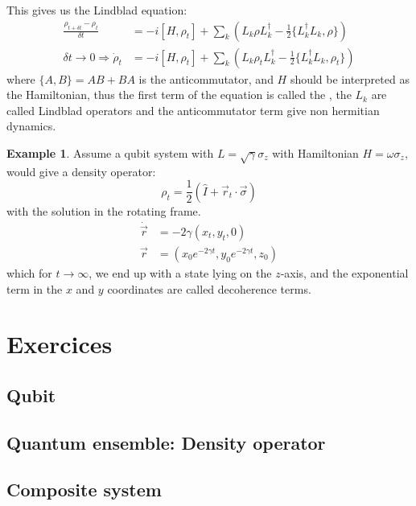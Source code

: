 \documentclass[12pt]{book}
\theoremstyle{definition}
\newtheorem*{expl}{\bfseries Example}
\renewcommand{\v}[1]{\vec{#1}}
\newcommand{\de}{\delta}
\let\oldsum\sum
\renewcommand{\sum}[2]{\oldsum\limits_{#1}^{#2}}
\renewcommand{\to}{\longrightarrow}
\newcommand{\si}{\sigma}
\newcommand{\para}[1]{\left( {#1} \right)}
\begin{document}
This gives us the Lindblad equation:
\begin{align}
  \frac{\rho_{t + \de t} - \rho_t}{\de t} & = - i [H, \rho_t] + \oldsum_k \para{L_k \rho L_k^\dagger - \frac{1}{2} \{L_k^\dagger L_k, \rho\}} \nonumber\\
  \de t \to 0 \Longrightarrow \dot{\rho}_t & = - i [H, \rho_t] + \oldsum_k \para{L_k \rho_t L_k^\dagger - \frac{1}{2} \{L_k^\dagger L_k, \rho_t\}}
\end{align}
where $\{A, B\} = AB + BA$ is the anticommutator, and $H$ should be interpreted as the Hamiltonian, thus the first term of the equation is called the , the $L_k$ are called Lindblad operators and the anticommutator term give non hermitian dynamics.

\begin{expl}
Assume a qubit system with $L = \sqrt{\gamma} \si_z$ with Hamiltonian $H = \omega \si_z$, would give a density operator:
\begin{equation*}
  \rho_t = \frac{1}{2} (\hat I + \v r_t \cdot \v \si)
\end{equation*}
with the solution in the rotating frame.
\begin{align*}
  \dot{\v r} & = - 2 \gamma (x_t, y_t, 0) \\
  \v r & = (x_0 e^{-2 \gamma t}, y_0 e^{-2 \gamma t}, z_0)
\end{align*}
which for $t \to \infty$, we end up with a state lying on the $z$-axis, and the exponential term in the $x$ and $y$ coordinates are called decoherence terms.
\end{expl}



\appendix
\chapter{Exercices}
\section{Qubit}

\section{Quantum ensemble: Density operator}

\section{Composite system}
\end{document}
